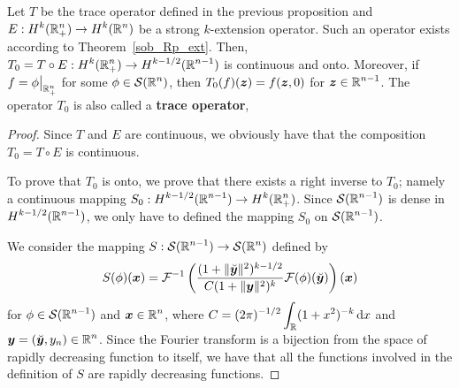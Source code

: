\begin{theorem} \label{TraceT0}
Let $T$ be the trace operator defined in the previous proposition and
$\displaystyle E: H^k(\mathbb{R}^n_+) \to H^k(\mathbb{R}^n)$ be a strong
$k$-extension operator.  Such an operator exists according to
Theorem~\ref{sob_Rp_ext}.
Then, $\displaystyle T_0 = T \circ E:H^k(\mathbb{R}^n_+)
\rightarrow H^{k-1/2}(\mathbb{R}^{n-1})$ is continuous and onto.
Moreover, if $\displaystyle f = \phi\big|_{\mathbb{R}^n_+}$ for some
$\displaystyle \phi \in \mathcal{S}(\mathbb{R}^n)$, then
$T_0(f)({\bm{z}}) = f({\bm{z}},0)$ for $\displaystyle {\bm{z}} \in \mathbb{R}^{n-1}$.
The operator $T_0$ is also called a
{\bfseries trace operator},
\end{theorem}

\begin{proof}
Since $T$ and $E$ are continuous, we obviously have that the
composition $T_0 = T \circ E$ is continuous.

To prove that $T_0$ is onto, we prove that there exists a right
inverse to $T_0$; namely a continuous mapping
$\displaystyle S_0:H^{k-1/2}(\mathbb{R}^{n-1}) \to H^k(\mathbb{R}^n_+)$.
Since $\displaystyle \mathcal{S}(\mathbb{R}^{n-1})$ is dense in
$\displaystyle H^{k-1/2}(\mathbb{R}^{n-1})$,
we only have to defined the mapping $S_0$ on $\displaystyle \mathcal{S}(\mathbb{R}^{n-1})$.

We consider the mapping $\displaystyle S:\mathcal{S}(\mathbb{R}^{n-1}) \to \mathcal{S}(\mathbb{R}^n)$
defined by
\[
S(\phi)({\bm{x}}) = \mathcal{F}^{-1}\left(
\frac{(1+\|\breve{{\bm{y}}}\|^2)^{k-1/2}}{C (1+ \|{\bm{y}}\|^2)^k}
\mathcal{F}(\phi)(\breve{{\bm{y}}}) \right)({\bm{x}})
\]
for $\displaystyle \phi \in \mathcal{S}(\mathbb{R}^{n-1})$ and
$\displaystyle {\bm{x}} \in \mathbb{R}^n$, where
$\displaystyle C = (2\pi)^{-1/2} \int_{\mathbb{R}} (1+x^2)^{-k}\,\mathrm{d}{x}$ and
$\displaystyle {\bm{y}} = (\breve{{\bm{y}}},y_n) \in \mathbb{R}^n$.  Since the Fourier
transform is a bijection from the space of rapidly decreasing function
to itself, we have that all the functions involved in the definition
of $S$ are rapidly decreasing functions.


\end{proof}

